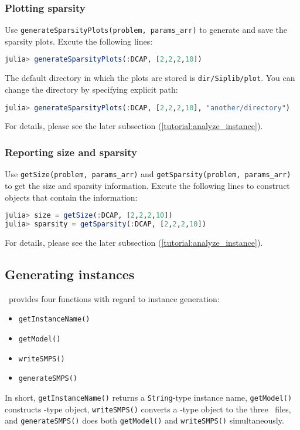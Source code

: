 \subsubsection{Plotting sparsity}
Use \texttt{generateSparsityPlots(problem, params\_arr)} to generate and save the sparsity plots. Excute the following lines:
\begin{lstlisting}[frame=single,language=julia]
julia> generateSparsityPlots(:DCAP, [2,2,2,10])
\end{lstlisting}
The default directory in which the plots are stored is \texttt{dir/Siplib/plot}. You can change the directory by specifying explicit path:
\begin{lstlisting}[frame=single,language=julia]
julia> generateSparsityPlots(:DCAP, [2,2,2,10], "another/directory")
\end{lstlisting}
For details, please see the later subsection (\ref{tutorial:analyze_instance}).
\subsubsection{Reporting size and sparsity}
Use \texttt{getSize(problem, params\_arr)} and \texttt{getSparsity(problem, params\_arr)} to get the size and sparsity information. Excute the following lines to construct objects that contain the information:
\begin{lstlisting}[frame=single,language=julia]
julia> size = getSize(:DCAP, [2,2,2,10])
julia> sparsity = getSparsity(:DCAP, [2,2,2,10])
\end{lstlisting}
For details, please see the later subsection (\ref{tutorial:analyze_instance}).

\subsection{Generating instances} \label{tutorial:gen_instance}
\siplibjl\ provides four functions with regard to instance generation:
\begin{itemize}
	\item \texttt{getInstanceName()}
	\item \texttt{getModel()}
	\item \texttt{writeSMPS()}
	\item \texttt{generateSMPS()}
\end{itemize}
In short, \texttt{getInstanceName()} returns a \texttt{String}-type instance name, \texttt{getModel()} constructs \jumpmodel-type object, \texttt{writeSMPS()} converts a \jumpmodel-type object to the three \smps\ files, and \texttt{generateSMPS()} does both \texttt{getModel()} and \texttt{writeSMPS()} simultaneously.
